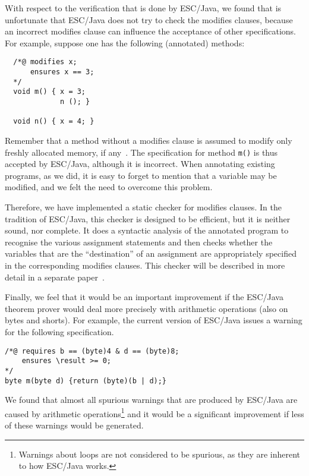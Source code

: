 \documentclass[a4paper]{llncs}
\begin{document}
With respect to the verification that is done by ESC/Java, we found
that is unfortunate that ESC/Java does not try to check the modifies
clauses, because an incorrect modifies clause can influence the
acceptance of other specifications. For example, suppose one has the
following (annotated) methods$:$
\begin{verbatim}
  /*@ modifies x;
      ensures x == 3;
  */
  void m() { x = 3;
             n (); }

  void n() { x = 4; }
\end{verbatim}
Remember that a method without a modifies clause is assumed to modify
only freshly allocated memory, if any~\cite{LeinoNS00}. The
specification for method \texttt{m()} is thus accepted by ESC/Java,
although it is incorrect. When annotating existing programs, as we
did, it is easy to forget to mention that a variable may be modified,
and we felt the need to overcome this problem.

Therefore, we have implemented a static checker for modifies
clauses. In the tradition of ESC/Java, this checker is designed to be
efficient, but it is neither sound, nor complete. It does a syntactic
analysis of the annotated program to recognise the various assignment
statements and then checks whether the variables that are the
``destination'' of an assignment are appropriately specified in the
corresponding modifies clauses. This checker will be described in more
detail in a separate paper~\cite{CatanoH02b}.

Finally, we feel that it would be an important improvement if the
ESC/Java theorem prover would deal more precisely with arithmetic
operations (also on bytes and shorts). For example, the current
version of ESC/Java issues a warning for the following specification.
\begin{verbatim}
/*@ requires b == (byte)4 & d == (byte)8;
    ensures \result >= 0;
*/
byte m(byte d) {return (byte)(b | d);}
\end{verbatim}
We found that almost all spurious warnings that are produced by
ESC/Java are caused by arithmetic operations\footnote{Warnings about
loops are not considered to be spurious, as they are inherent to how
ESC/Java works.} and it would be a significant improvement if less of
these warnings would be generated.

\end{document}
